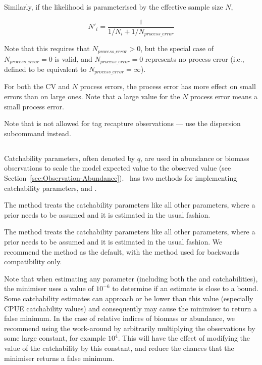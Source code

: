 Similarly, if the likelihood is parameterised by the effective sample size $N$,

\begin{equation}
	N'_i  = \frac{1}{1 / {N_i}+ 1 / N_{process\_error}}
\end{equation}

Note that this requires that $N_{process\_ error} > 0$, but the special case of $N_{process\_ error}=0$ is valid, and $N_{process\_ error}=0$ represents no process error (i.e., defined to be equivalent to $N_{process\_ error}=\infty$).

For both the CV and $N$ process errors, the process error has more effect on small errors than on large ones. Note that a large value for the $N$ process error means a small process error. 

Note that  is not allowed for tag recapture observations --- use the dispersion subcommand instead.

\subsection{}\label{subsec:catchabilities}

Catchability parameters, often denoted by \(q\), are used in abundance or biomass observations to scale the model expected value to the observed value (see Section~\ref{sec:Observation-Abundance}). \CNAME\ has two methods for implementing catchability parameters,  and . 

The  method treats the catchability parameters like all other parameters, where a prior needs to be assumed and it is estimated in the usual fashion.

The  method treats the catchability parameters like all other parameters, where a prior needs to be assumed and it is estimated in the usual fashion. We recommend the  method as the default, with the  method used for backwards compatibility only.

Note that when estimating any parameter (including both the  and  catchabilities), the minimiser uses a value of $10^{-6}$ to determine if an estimate is close to a bound. Some catchability estimates can approach or be lower than this value (especially CPUE catchability values) and consequently may cause the minimiser to return a false minimum. In the case of relative indices of biomass or abundance, we recommend using the work-around by arbitrarily multiplying the observations by some large constant, for example $10^4$. This will have the effect of modifying the value of the catchability by this constant, and reduce the chances that the minimiser returns a false minimum.

